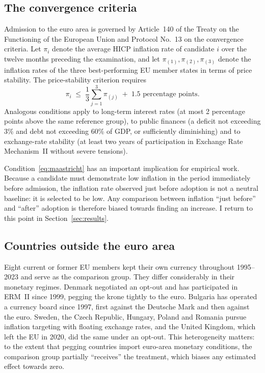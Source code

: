 \documentclass[11pt,a4paper]{article}
\numberwithin{equation}{section}
\theoremstyle{definition}
\theoremstyle{remark}
\begin{document}
\subsection{The convergence criteria}
Admission to the euro area is governed by Article~140 of the Treaty on the Functioning of the European Union and Protocol No.~13 on the convergence criteria. Let $\pi_{i}$ denote the average HICP inflation rate of candidate $i$ over the twelve months preceding the examination, and let $\pi_{(1)}, \pi_{(2)}, \pi_{(3)}$ denote the inflation rates of the three best-performing EU member states in terms of price stability. The price-stability criterion requires
\begin{equation}
\pi_i \;\leq\; \frac{1}{3}\sum_{j=1}^{3}\pi_{(j)} \;+\; 1.5 \text{ percentage points}.
\label{eq:maastricht}
\end{equation}
Analogous conditions apply to long-term interest rates (at most 2 percentage points above the same reference group), to public finances (a deficit not exceeding 3\% and debt not exceeding 60\% of GDP, or sufficiently diminishing) and to exchange-rate stability (at least two years of participation in Exchange Rate Mechanism~II without severe tensions).

Condition~\eqref{eq:maastricht} has an important implication for empirical work. Because a candidate must demonstrate low inflation in the period immediately before admission, the inflation rate observed just before adoption is not a neutral baseline: it is selected to be low. Any comparison between inflation ``just before'' and ``after'' adoption is therefore biased towards finding an increase. I return to this point in Section~\ref{sec:results}.

\subsection{Countries outside the euro area}
Eight current or former EU members kept their own currency throughout 1995--2023 and serve as the comparison group. They differ considerably in their monetary regimes. Denmark negotiated an opt-out and has participated in ERM~II since 1999, pegging the krone tightly to the euro. Bulgaria has operated a currency board since 1997, first against the Deutsche Mark and then against the euro. Sweden, the Czech Republic, Hungary, Poland and Romania pursue inflation targeting with floating exchange rates, and the United Kingdom, which left the EU in 2020, did the same under an opt-out. This heterogeneity matters: to the extent that pegging countries import euro-area monetary conditions, the comparison group partially ``receives'' the treatment, which biases any estimated effect towards zero.
\end{document}
